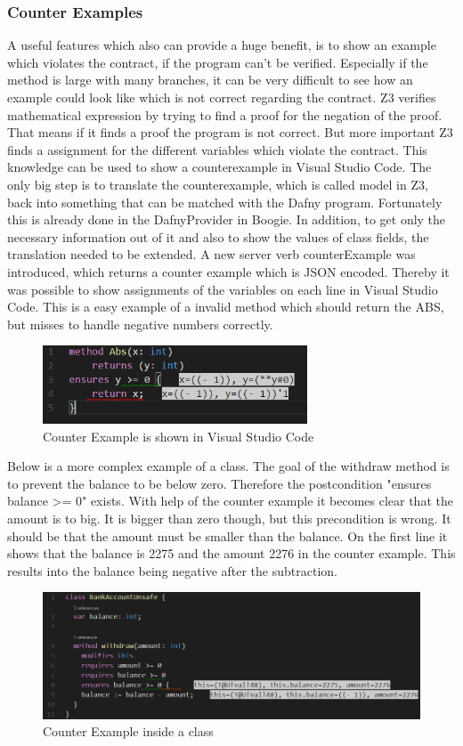 \subsubsection{Counter Examples}
A useful features which also can provide a huge benefit, is to show an example which violates the contract, if the program can't be verified. Especially if the method is large with many branches, it can be very difficult to see how an example could look like which is not correct regarding the contract. \newline
Z3 verifies mathematical expression by trying to find a proof for the negation of the proof. That means if it finds a proof the program is not correct. But more important Z3 finds a assignment for the different variables which violate the contract. This knowledge can be used to show a counterexample in Visual Studio Code. The only big step is to translate the counterexample, which is called model in Z3, back into something that can be matched with the Dafny program. Fortunately this is already done in the DafnyProvider in Boogie. In addition, to get only the necessary information out of it and also to show the values of class fields, the translation needed to be extended. A new server verb counterExample was introduced, which returns a counter example which is JSON encoded. Thereby it was possible to show assignments of the variables on each line in Visual Studio Code. \newline
This is a easy example of a invalid method which should return the ABS, but misses to handle negative numbers correctly. 
\begin{figure}[H]
	\centering
	\includegraphics[width=0.7\textwidth]{img/counterModel}
	\caption{Counter Example is shown in Visual Studio Code}
	\label{fig:counterModel}
\end{figure}
Below is a more complex example of a class. The goal of the withdraw method is to prevent the balance to be below zero. Therefore the postcondition "ensures balance >= 0" exists. With help of the counter example it becomes clear that the amount is to big. It is bigger than zero though, but this precondition is wrong. It should be that the amount must be smaller than the balance. On the first line it shows that the balance is 2275 and the amount 2276 in the counter example. This results into the balance being negative after the subtraction. 
\begin{figure}[H]
	\centering
	\includegraphics[width=1\textwidth]{img/counterModelBank}
	\caption{Counter Example inside a class}
	\label{fig:counterModelBank}
\end{figure}
